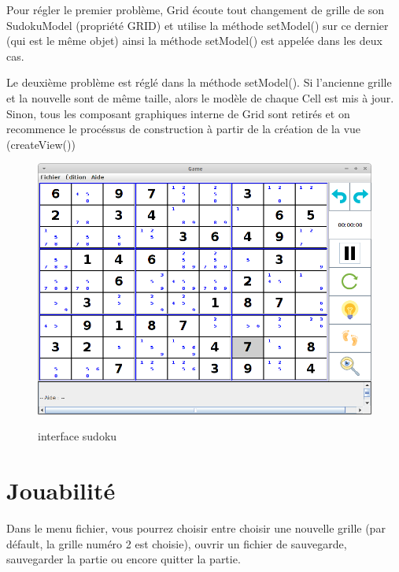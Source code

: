 Pour régler le premier problème, Grid écoute tout changement de grille de son
SudokuModel (propriété GRID) et utilise la méthode setModel() sur ce dernier
(qui est le même objet) ainsi la méthode setModel() est appelée dans les deux cas.

Le deuxième problème est réglé dans la méthode setModel(). Si l'ancienne grille
et la nouvelle sont de même taille, alors le modèle de chaque Cell est mis à jour.
Sinon, tous les composant graphiques interne de Grid sont retirés et on recommence
le procéssus de construction à partir de la création de la vue (createView())


\begin{figure}[ht]
  \caption{\label{annexe6} interface sudoku}
  \includegraphics [width=130mm]{images/interface.png} \\[0.5cm]
\end{figure}

\newpage
\section{Jouabilité}
Dans le menu fichier, vous pourrez choisir entre choisir 
une nouvelle grille (par défault, la grille numéro 2 est choisie),
ouvrir un fichier de sauvegarde, 
sauvegarder la partie ou encore quitter la partie.


